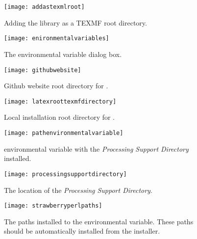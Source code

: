 \begin{figure}
	\centering
	\texttt{[image: addastexmlroot]}
	\caption[Adding the library as a TEXMF root directory]{Adding the library as a TEXMF root directory.}
	\label{fig:addastexmlroot}
\end{figure}

\begin{figure}
	\centering
	\texttt{[image: enironmentalvariables]}
	\caption[The environmental variable dialog box]{The environmental variable dialog box.}
	\label{fig:enironmentalvariables}
\end{figure}


\begin{figure}
	\centering
	\texttt{[image: githubwebsite]}
	\caption[Github website root directory]{Github website root directory for \lelatex{}.}
	\label{fig:githubwebsite}
\end{figure}

\begin{figure}
	\centering
	\texttt{[image: latexroottexmfdirectory]}
	\caption[Local installation root directory for \lelatex{}]{Local installation root directory for \lelatex{}.}
	\label{fig:latexroottexmfdirectory}
\end{figure}


\begin{figure}
	\centering
	\texttt{[image: pathenvironmentalvariable]}
	\caption[\pathenvvar{} environmental variable with the \emph{Processing Support Directory} installed]{\pathenvvar{} environmental variable with the \emph{Processing Support Directory} installed.}
	\label{fig:pathenvironmentalvariable}
\end{figure}

\begin{figure}
	\centering
	\texttt{[image: processingsupportdirectory]}
	\caption[The location of the \emph{Processing Support Directory}]{The location of the \emph{Processing Support Directory}.}
	\label{fig:processingsupportdirectory}
\end{figure}

\begin{figure}
	\centering
	\texttt{[image: strawberryperlpaths]}
	\caption[The \strawberryperl{} paths installed to the \pathenvvar{} environmental variable]{The \strawberryperl{} paths installed to the \pathenvvar{} environmental variable.  These paths should be automatically installed from the \strawberryperl{} installer.}
	\label{fig:strawberryperlpaths}
\end{figure}